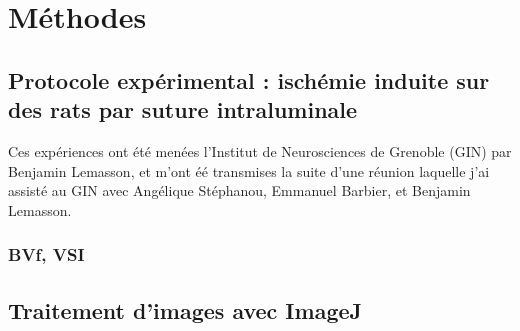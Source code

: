 \section{M\'ethodes}

\makeatletter
\renewcommand{\thefigure}{\ifnum \c@section>\z@ \thesection.\fi
 \@arabic\c@figure}
\makeatother
\begin{comment}
Remarque : pour renuméroter les sous-figures de la même manière
           (avec le package 'subfigure'), il suffit de rajouter
	   la ligne \let\p@subfigure\thefigure dans le préambule.
\end{comment}

\subsection{Protocole exp\'erimental : isch\'emie induite sur des rats par suture intraluminale}

Ces exp\'eriences ont \'et\'e men\'ees  l'Institut de Neurosciences de Grenoble (GIN) par Benjamin Lemasson, %
et m'ont \'e\'e transmises  la suite d'une r\'eunion  laquelle j'ai assist\'e au GIN %
avec Ang\'elique St\'ephanou, Emmanuel Barbier, et Benjamin Lemasson.



\subsubsection{BVf, VSI}




\subsection{Traitement d'images avec ImageJ}

